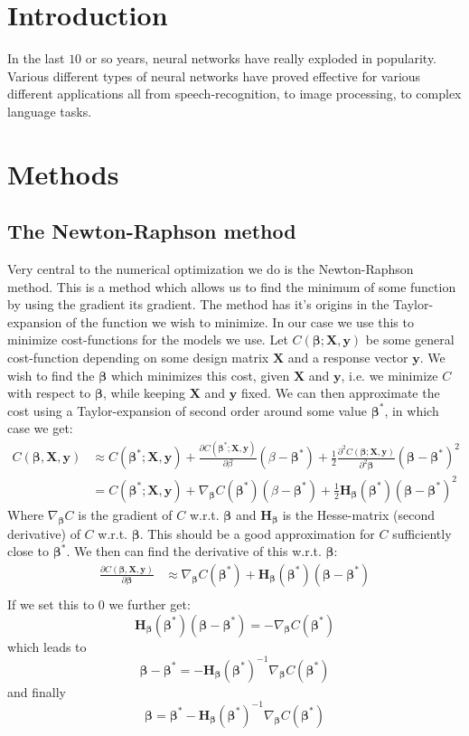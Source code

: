 \documentclass{article}
\begin{document}
\section{Introduction}
In the last $10$ or so years, neural networks have really exploded in
popularity. Various different types of neural networks have proved effective for
various different applications all from speech-recognition, to image processing,
to complex language tasks.

\section{Methods}
\subsection{The Newton-Raphson method}
Very central to the numerical optimization we do is the Newton-Raphson method.
This is a method which allows us to find the minimum of some function by using
the gradient its gradient. The method has it's origins in the Taylor-expansion
of the function we wish to minimize. In our case we use this to minimize
cost-functions for the models we use. Let $C(\bm{\beta}; \bm{X}, \bm{y})$ be
some general cost-function depending on some design matrix $\bm{X}$ and a
response vector $\bm{y}$. We wish to find the $\bm{\beta}$ which minimizes this
cost, given $\bm{X}$ and $\bm{y}$, i.e. we minimize $C$ with respect to
$\bm{\beta}$, while keeping $\bm{X}$ and $\bm{y}$ fixed. We can then approximate
the cost using a Taylor-expansion of second order around some value
$\bm{\beta}^*$, in which case we get:
\begin{align*}
      C(\bm{\beta}, \bm{X}, \bm{y}) & \approx C(\bm{\beta}^*; \bm{X}, \bm{y}) + \frac{\partial C(\bm{\beta}^*; \bm{X}, \bm{y})}{\partial \beta}(\beta - \bm{\beta}^*) + \frac{1}{2} \frac{\partial^2 C(\bm{\beta}; \bm{X}, \bm{y})}{\partial^2 \bm{\beta}}(\bm{\beta} - \bm{\beta}^*)^2 \\
                                    & = C(\bm{\beta}^*; \bm{X}, \bm{y}) + \nabla_{\bm{\beta}} C(\bm{\beta}^*) (\beta - \bm{\beta}^*) + \frac{1}{2} \bm{H}_{\bm{\beta}}(\bm{\beta}^*) (\bm{\beta} - \bm{\beta}^*)^2
\end{align*}
Where $\nabla_{\bm{\beta}} C$ is the gradient of $C$ w.r.t. $\bm{\beta}$ and
$\bm{H}_{\bm{\beta}}$ is the Hesse-matrix (second derivative) of $C$ w.r.t.
$\bm{\beta}$. This should be a good approximation for $C$ sufficiently close to
$\bm{\beta}^*$. We then can find the derivative of this w.r.t. $\bm{\beta}$:
\begin{align*}
      \frac{\partial C(\bm{\beta}, \bm{X}, \bm{y})}{\partial \bm{\beta}} & \approx
      \nabla_{\bm{\beta}} C(\bm{\beta}^*) + \bm{H}_{\bm{\beta}}(\bm{\beta}^*)(\bm{\beta} - \bm{\beta}^*) \\
\end{align*}
If we set this to $0$ we further get:
$$\bm{H}_{\bm{\beta}}(\bm{\beta}^*) (\bm{\beta} - \bm{\beta}^*) = -\nabla_{\bm{\beta}} C(\bm{\beta}^*)$$
which leads to
$$\bm{\beta} - \bm{\beta}^* = - \bm{H}_{\bm{\beta}}(\bm{\beta}^*)^{-1} \nabla_{\bm{\beta}} C(\bm{\beta}^*)$$
and finally
$$\bm{\beta} = \bm{\beta}^* - \bm{H}_{\bm{\beta}}(\bm{\beta}^*)^{-1} \nabla_{\bm{\beta}} C(\bm{\beta}^*)$$
\end{document}
